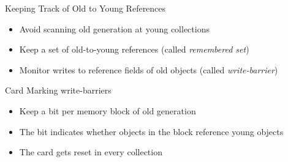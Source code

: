 \documentclass[
14pt,
aspectratio=169,
usenames,
dvipsnames,
x11names]{beamer}
\begin{document}
\begin{frame}{Keeping Track of Old to Young References}
  \begin{itemize}  \setlength{\itemsep}{\fill}
  \item \alert{Avoid scanning} old generation at young collections
  \item Keep a set of \alert{old-to-young references} (called \textit{remembered set})
  \item \alert{Monitor writes} to reference fields of old objects (called \textit{write-barrier})
  \end{itemize}
\end{frame}

\begin{frame}{Card Marking write-barriers}
  \begin{itemize}  \setlength{\itemsep}{\fill}
  \item Keep a bit per memory block of old generation
  \item The bit indicates whether objects in the block reference young objects
  \item The card gets reset in every collection
  \end{itemize}
\end{frame}
\end{document}

